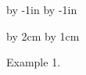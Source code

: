 \hsize=210mm
\vsize=297mm

\advance\voffset by -1in
\advance\hoffset by -1in

\advance\voffset by 2cm
\advance\hoffset by 1cm

\parindent=0pt

\def\epsfsize#1#2{#1}



Example 1.





\bye



